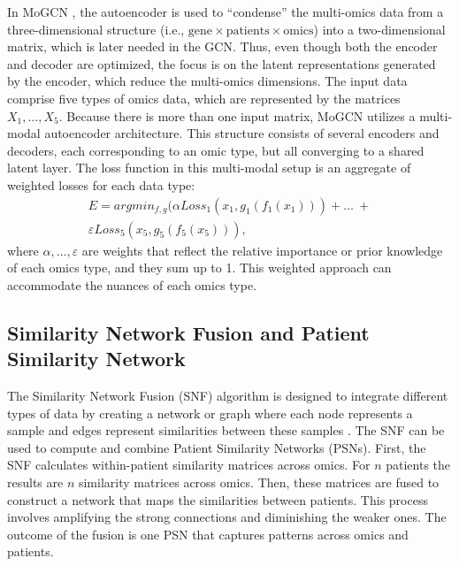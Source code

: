 \documentclass[unnumsec,webpdf,modern,large]{oup-authoring-template}
\theoremstyle{thmstyleone}%
\theoremstyle{thmstyletwo}%
\theoremstyle{thmstylethree}%
\begin{document}
\par In MoGCN \cite{Li2022}, the autoencoder is used to “condense” the multi-omics data from a three-dimensional structure (i.e., ${\text{gene} \times \text{patients} \times \text{omics}} $) into a two-dimensional matrix, which is later needed in the GCN. Thus, even though both the encoder and decoder are optimized, the focus is on the latent representations generated by the encoder, which reduce the multi-omics dimensions. The input data comprise five types of omics data, which are represented by the matrices $X_1,\ldots,X_5$. Because there is more than one input matrix, MoGCN utilizes a multi-modal autoencoder architecture. This structure consists of several encoders and decoders, each corresponding to an omic type, but all converging to a shared latent layer. The loss function in this multi-modal setup is an aggregate of weighted losses for each data type:
\begin{multline}
E = argmin_{f,g} (\alpha Loss_1 (x_1, g_1(f_1(x_1))) + \ldots \ + \\
\varepsilon Loss_5 (x_5, g_5(f_5(x_5))),\label{AE} 
\end{multline}
where $\alpha ,\ldots, \varepsilon$ are weights that reflect the relative importance or prior knowledge of each omics type, and they sum up to 1. This weighted approach can accommodate the nuances of each omics type.


\subsection{Similarity Network Fusion and Patient Similarity Network}

The Similarity Network Fusion (SNF) algorithm is designed to integrate different types of data by creating a network or graph where each node represents a sample and edges represent similarities between these samples \cite{wang2014similarity}. The SNF can be used to compute and combine Patient Similarity Networks (PSNs). First, the SNF calculates within-patient similarity matrices across omics. For $n$ patients the results are $n$ similarity matrices across omics. Then, these matrices are fused to construct a network that maps the similarities between patients. This process involves amplifying the strong connections and diminishing the weaker ones. The outcome of the fusion is one PSN that captures patterns across omics and patients. 
\end{document}
